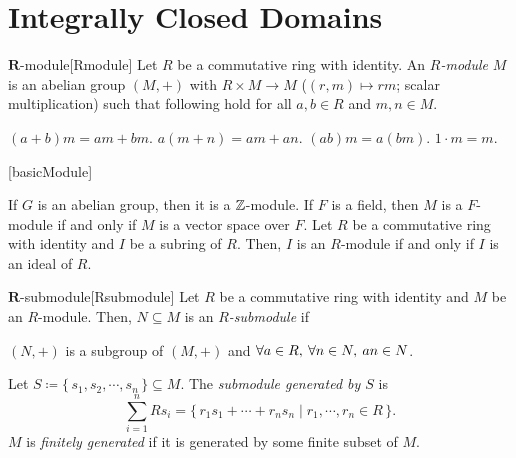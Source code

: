 \documentclass[../modern_algebra_2.tex]{subfiles}
\begin{document}
\section{Integrally Closed Domains}

\begin{Definition}{\(\bm{R}\)-module}[Rmodule]
    Let \(R\) be a commutative ring with identity.
    An \emph{\(R\)-module} \(M\) is an abelian group \((M, +)\)
    with \(R \times M \to M\) (\((r, m) \mapsto rm\); scalar multiplication)
    such that following hold for all \(a, b \in R\) and \(m, n \in M\).
    \begin{enumerate}[label=(\arabic*)]
        \ii \((a+b)m = am+bm\).
        \ii \(a(m+n)=am+an\).
        \ii \((ab)m=a(bm)\).
        \ii \(1\cdot m = m\).
    \end{enumerate}
\end{Definition}

\begin{Example}{}[basicModule]
\begin{enumerate}[label=(\arabic*), ref=\protect{(\arabic*)}]
    \ii
    If \(G\) is an abelian group, then it is a \(\ZZ\)-module.
    \ii
    If \(F\) is a field, then \(M\) is a \(F\)-module if and only if \(M\)
    is a vector space over \(F\).
    \ii
    Let \(R\) be a commutative ring with identity and \(I\) be a subring of \(R\).
    Then, \(I\) is an \(R\)-module if and only if \(I\) is an ideal of \(R\).
\end{enumerate}
\end{Example}

\begin{Definition}{\(\bm{R}\)-submodule}[Rsubmodule]
    Let \(R\) be a commutative ring with identity
    and \(M\) be an \(R\)-module.
    Then, \(N \subseteq M\) is an \emph{\(R\)-submodule} if
    \begin{enumerate}[label=(\arabic*)]
        \ii \((N, +)\) is a subgroup of \((M, +)\) and
        \ii \(\forall a \in R,\: \forall n \in N,\: an \in N\).
    \end{enumerate}

    Let \(S \coloneqq \{\,s_1, s_2, \cdots, s_n\,\} \subseteq M\).
    The \emph{submodule generated by \(S\)} is
    \[\textstyle
        \sum_{i=1}^n Rs_i = \{\,r_1s_1 + \cdots + r_ns_n \mid r_1, \cdots, r_n \in R\,\}\text{.}
    \]
    \(M\) is \emph{finitely generated} if it is generated by some finite subset of \(M\).
\end{Definition}
\end{document}

